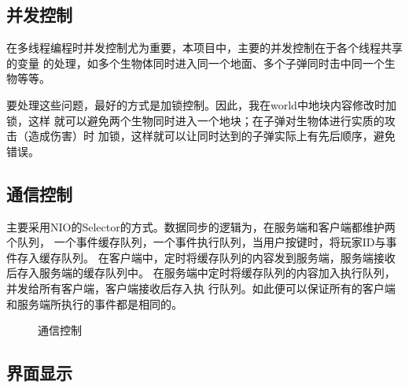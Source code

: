 \documentclass{SCIS2022cn}
\begin{document}
\subsection{并发控制}

在多线程编程时并发控制尤为重要，本项目中，主要的并发控制在于各个线程共享的变量
的处理，如多个生物体同时进入同一个地面、多个子弹同时击中同一个生物等等。

要处理这些问题，最好的方式是加锁控制。因此，我在world中地块内容修改时加锁，这样
就可以避免两个生物同时进入一个地块；在子弹对生物体进行实质的攻击（造成伤害）时
加锁，这样就可以让同时达到的子弹实际上有先后顺序，避免错误。

\subsection{通信控制}

主要采用NIO的Selector的方式。数据同步的逻辑为，在服务端和客户端都维护两个队列，
一个事件缓存队列，一个事件执行队列，当用户按键时，将玩家ID与事件存入缓存队列。
在客户端中，定时将缓存队列的内容发到服务端，服务端接收后存入服务端的缓存队列中。
在服务端中定时将缓存队列的内容加入执行队列，并发给所有客户端，客户端接收后存入执
行队列。如此便可以保证所有的客户端和服务端所执行的事件都是相同的。


\begin{figure}[H]
    \centering
    \caption{通信控制}
    \label{Fig.f321}
\end{figure}

\subsection{界面显示}
\end{document}
